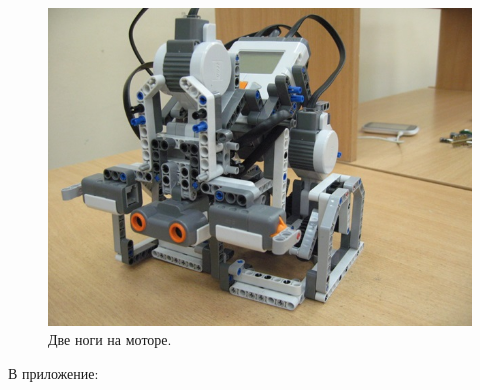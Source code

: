 \begin{figure}[h!]
	\begin{center}
		\includegraphics[width=0.86\linewidth]{chapters/chapter22/images/11}
		\caption{Две ноги на моторе.}
		\label{ris:image22x11}
	\end{center}
\end{figure}

\noindent В приложение:\\\\
\href{http://web.mat.bham.ac.uk/C.J.Sangwin/howroundcom/straightline/index.html}{}\\\\
\href{http://ebooks.library.cornell.edu/cgi/t/text/text-idx?c=math;cc=math;rgn=main;view=text;idno=kemp009}{}\\\\
\href{http://klu.narod.ru/diss1-053-3.html}{}